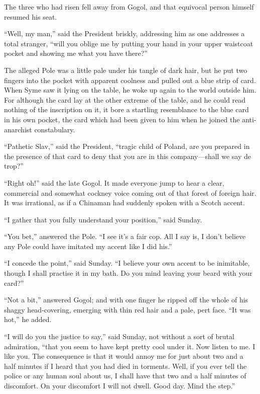 The three who had risen fell away from Gogol, and that equivocal person himself resumed his seat.

“Well, my man,” said the President briskly, addressing him as one addresses a total stranger, “will you oblige me by putting your hand in your upper waistcoat pocket and showing me what you have there?”

The alleged Pole was a little pale under his tangle of dark hair, but he put two fingers into the pocket with apparent coolness and pulled out a blue strip of card. When Syme saw it lying on the table, he woke up again to the world outside him. For although the card lay at the other extreme of the table, and he could read nothing of the inscription on it, it bore a startling resemblance to the blue card in his own pocket, the card which had been given to him when he joined the anti-anarchist constabulary.

“Pathetic Slav,” said the President, “tragic child of Poland, are you prepared in the presence of that card to deny that you are in this company⁠—shall we say de trop?”

“Right oh!” said the late Gogol. It made everyone jump to hear a clear, commercial and somewhat cockney voice coming out of that forest of foreign hair. It was irrational, as if a Chinaman had suddenly spoken with a Scotch accent.

“I gather that you fully understand your position,” said Sunday.

“You bet,” answered the Pole. “I see it’s a fair cop. All I say is, I don’t believe any Pole could have imitated my accent like I did his.”

“I concede the point,” said Sunday. “I believe your own accent to be inimitable, though I shall practise it in my bath. Do you mind leaving your beard with your card?”

“Not a bit,” answered Gogol; and with one finger he ripped off the whole of his shaggy head-covering, emerging with thin red hair and a pale, pert face. “It was hot,” he added.

“I will do you the justice to say,” said Sunday, not without a sort of brutal admiration, “that you seem to have kept pretty cool under it. Now listen to me. I like you. The consequence is that it would annoy me for just about two and a half minutes if I heard that you had died in torments. Well, if you ever tell the police or any human soul about us, I shall have that two and a half minutes of discomfort. On your discomfort I will not dwell. Good day. Mind the step.”

